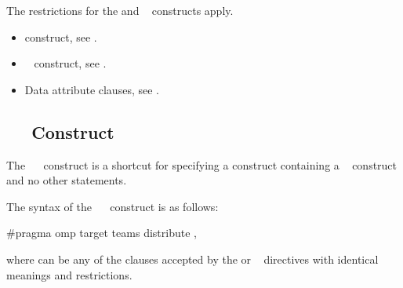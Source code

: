 \restrictions
The restrictions for the  and ~ constructs apply.

\crossreferences
\begin{itemize}
\item {} construct, see
.

\item {}~ construct, see
.

\item Data attribute clauses, see
.
\end{itemize}











\subsection{~~ Construct}
\label{subsec:target teams distribute construct}
\summary
The ~~ construct is a shortcut for specifying a  construct
containing a ~ construct and no other statements.

\syntax
\begin{ccppspecific}
The syntax of the ~~ construct is as follows:

\begin{ompcPragma}
#pragma omp target teams distribute \plc{[clause[ [},\plc{] clause] ... ] new-line}
\end{ompcPragma}

where  can be any of the clauses accepted by the  or ~ directives
with identical meanings and restrictions.
\end{ccppspecific}


